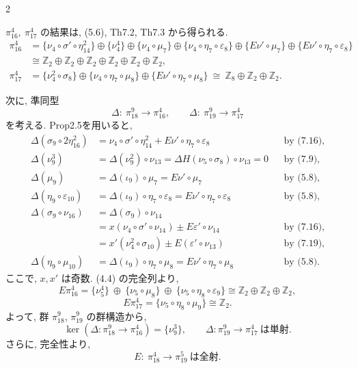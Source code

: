 \documentclass[10pt, leqno]{ltjsarticle}
\newcommand{\gen}[1]{\{#1\}}       %
\newcommand{\pit}[2]{\pi_{#1}^{#2}}
\numberwithin{equation}{section}
\theoremstyle{plain}
\theoremstyle{definition}
\theoremstyle{remark}
\begin{document}
\begin{paracol}{2}

\noindent
\(\pit{16}{4},\ \pit{17}{4}\) の結果は, 
(5.6), Th7.2, Th7.3 から得られる.
\[
\begin{align*}
\pit{16}{4}
& = \gen{\nu_{4}\circ\sigma'\circ\eta_{14}^{2}}
   \oplus\gen{\nu_4^4}
   \oplus\gen{\nu_{4}\circ\mu_{7}}
   \oplus\gen{\nu_{4}\circ\eta_{7}\circ\varepsilon_{8}}
   \oplus\gen{E\nu'\circ\mu_{7}}
   \oplus\gen{E\nu'\circ\eta_{7}\circ\varepsilon_{8}} \\
& \cong \mathbb{Z}_2 \oplus\mathbb{Z}_2\oplus\mathbb{Z}_2\oplus\mathbb{Z}_2
\oplus\mathbb{Z}_2\oplus\mathbb{Z}_2, \\
\pit{17}{4}
& = \gen{\nu_4^2\circ\sigma_8}\oplus
   \gen{\nu_4\circ\eta_7\circ\mu_8}\oplus
   \gen{E\nu'\circ\eta_7\circ\mu_8}
 \ \cong\ \mathbb{Z}_8\oplus\mathbb{Z}_2\oplus\mathbb{Z}_2.
\end{align*}
\]

次に, 準同型
\[
\Delta:\ \pit{18}{9}\longrightarrow\pit{16}{4},\qquad
\Delta:\ \pit{19}{9}\longrightarrow\pit{17}{4}
\]
を考える.  Prop2.5を用いると,
\[
\begin{aligned}
\Delta(\sigma_9\circ 2\eta_{16}^2)
  &=\nu_4\circ\sigma'\circ \eta_{14}^2
    +E\nu'\circ\eta_7\circ\varepsilon_8
   &&\text{by (7.16)},\\
\Delta(\nu_9^{3})
  &=\Delta(\nu_9^{2})\circ\nu_{13}
   =\Delta H(\nu_5\circ\sigma_8)\circ\nu_{13}
   =0
   &&\text{by (7.9)},\\
\Delta(\mu_9)
  &=\Delta(\iota_9)\circ\mu_7=E\nu'\circ\mu_7
   &&\text{by (5.8)},\\
\Delta(\eta_9\circ\varepsilon_{10})
  &=\Delta(\iota_9)\circ\eta_7\circ\varepsilon_8
   =E\nu'\circ\eta_7\circ\varepsilon_8
   &&\text{by (5.8)},\\
\Delta(\sigma_9\circ\nu_{16})
  &=\Delta(\sigma_9)\circ\nu_{14}\\
  &=x(\nu_4\circ\sigma'\circ\nu_{14}) \pm E\varepsilon'\circ\nu_{14}
   &&\text{by (7.16)},\\
  &=x'(\nu_4^2\circ\sigma_{10}) \pm E(\varepsilon'\circ\nu_{13})
   &&\text{by (7.19)},\\
\Delta(\eta_9\circ\mu_{10})
  &=\Delta(\iota_9)\circ\eta_7\circ\mu_8
   =E\nu'\circ\eta_7\circ\mu_8
   &&\text{by (5.8)}.
\end{aligned}
\]
ここで, \(x,x'\) は奇数.
(4.4) の完全列より,
\[
E\pi_{16}^4
 = \gen{\nu_5^4}\ \oplus\ \gen{\nu_5\circ\mu_8}\ \oplus\
   \gen{\nu_5\circ\eta_8\circ\varepsilon_9}
 \cong \mathbb{Z}_2\oplus\mathbb{Z}_2\oplus\mathbb{Z}_2,
\]
\[
E\pi_{17}^4
 = \gen{\nu_5\circ\eta_8\circ\mu_9}
 \cong \mathbb{Z}_2 .
\]
よって, 群 \(\pi_{18}^9\), \(\pi_{19}^9\) の群構造から,
\[
\ker(\Delta:\pit{18}{9}\to\pit{16}{4}) = \gen{\nu_9^{3}},\qquad
\Delta: \pit{19}{9}\to\pit{17}{4}\ \text{は単射}.
\]
さらに, 完全性より,
\begin{equation}
E:\ \pit{18}{4}\longrightarrow\pit{19}{5}\ \text{は全射}.  
\end{equation}


\end{paracol}
\end{document}
